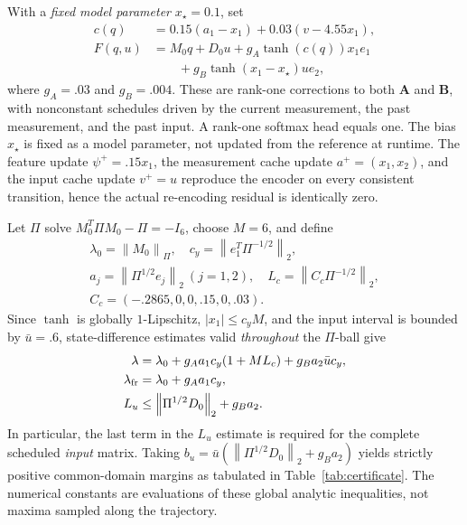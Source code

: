\documentclass[journal]{IEEEtran}
\theoremstyle{plain}
\theoremstyle{definition}
\newcommand{\mA}{\mathbf{A}}
\newcommand{\mB}{\mathbf{B}}
\newcommand{\norm}[1]{\left\lVert #1\right\rVert}
\begin{document}
With a \emph{fixed model parameter} $x_\star=0.1$, set
\begin{equation}
\begin{split}
c(q)&=0.15(a_1-x_1)+0.03(v-4.55x_1),\\
F(q,u)&=M_0q+D_0u+g_A\tanh(c(q))x_1e_1\\
&\qquad+g_B\tanh(x_1-x_\star)ue_2,
\end{split}
\label{eq:nonzero_analytic_predictor}
\end{equation}
where $g_A=.03$ and $g_B=.004$. These are rank-one corrections to both $\mA$ and $\mB$, with nonconstant schedules driven by the current measurement, the past measurement, and the past input. A rank-one softmax head equals one. The bias $x_\star$ is fixed as a model parameter, not updated from the reference at runtime. The feature update $\psi^+=.15x_1$, the measurement cache update $a^+=(x_1,x_2)$, and the input cache update $v^+=u$ reproduce the encoder on every consistent transition, hence the actual re-encoding residual is identically zero.

Let $\Pi$ solve $M_0^T\Pi M_0-\Pi=-I_6$, choose $M=6$, and define
\begin{equation}
\begin{gathered}
\lambda_0=\norm{M_0}_\Pi,\quad
c_y=\norm{e_1^T\Pi^{-1/2}}_2,\\
a_j=\norm{\Pi^{1/2}e_j}_2\ (j=1,2),\quad
L_c=\norm{C_c\Pi^{-1/2}}_2,\\
C_c=(-.2865,0,0,.15,0,.03).
\end{gathered}
\end{equation}
Since $\tanh$ is globally $1$-Lipschitz, $|x_1|\le c_y M$, and the input interval is bounded by $\bar u=.6$, state-difference estimates valid \emph{throughout} the $\Pi$-ball give
\begin{equation}
\begin{aligned}
\lambda&=\lambda_0+g_Aa_1c_y(1+ML_c)
+g_Ba_2\bar u c_y,\\
\lambda_{\rm fr}&=\lambda_0+g_Aa_1c_y,\\
L_u&\le\norm{\Pi^{1/2}D_0}_2+g_Ba_2.
\end{aligned}
\label{eq:analytic_scheduled_rates}
\end{equation}
In particular, the last term in the $L_u$ estimate is required for the complete scheduled \emph{input} matrix. Taking $b_u=\bar u(\norm{\Pi^{1/2}D_0}_2+g_Ba_2)$ yields strictly positive common-domain margins as tabulated in Table~\ref{tab:certificate}. The numerical constants are evaluations of these global analytic inequalities, not maxima sampled along the trajectory.
\end{document}
